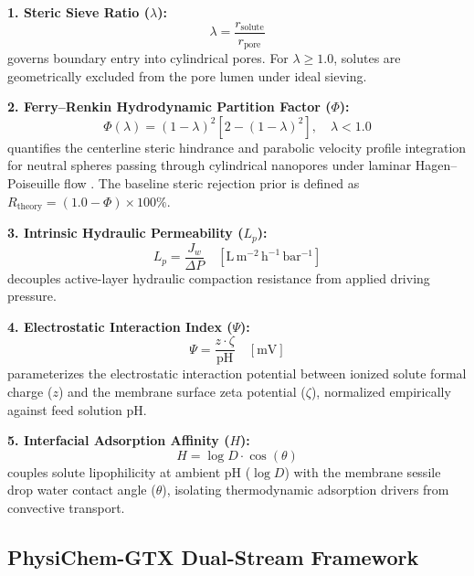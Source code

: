 \documentclass[11pt]{article}
\begin{document}
\textbf{1. Steric Sieve Ratio ($\lambda$):}
\begin{equation}
\lambda = \frac{r_{\mathrm{solute}}}{r_{\mathrm{pore}}}
\label{eq:lambda}
\end{equation}
governs boundary entry into cylindrical pores. For $\lambda \geq 1.0$, solutes are geometrically excluded from the pore lumen under ideal sieving.

\textbf{2. Ferry--Renkin Hydrodynamic Partition Factor ($\Phi$):}
\begin{equation}
\Phi(\lambda) = (1-\lambda)^2 \left[2 - (1-\lambda)^2\right], \quad \lambda < 1.0
\label{eq:ferry_renkin}
\end{equation}
quantifies the centerline steric hindrance and parabolic velocity profile integration for neutral spheres passing through cylindrical nanopores under laminar Hagen--Poiseuille flow \cite{ferry1936,renkin1954}. The baseline steric rejection prior is defined as $R_{\mathrm{theory}} = (1.0 - \Phi) \times 100\%$.

\textbf{3. Intrinsic Hydraulic Permeability ($L_p$):}
\begin{equation}
L_p = \frac{J_w}{\Delta P} \quad \left[\mathrm{L\,m^{-2}\,h^{-1}\,bar^{-1}}\right]
\label{eq:lp}
\end{equation}
decouples active-layer hydraulic compaction resistance from applied driving pressure.

\textbf{4. Electrostatic Interaction Index ($\Psi$):}
\begin{equation}
\Psi = \frac{z \cdot \zeta}{\mathrm{pH}} \quad [\mathrm{mV}]
\label{eq:psi}
\end{equation}
parameterizes the electrostatic interaction potential between ionized solute formal charge ($z$) and the membrane surface zeta potential ($\zeta$), normalized empirically against feed solution pH.

\textbf{5. Interfacial Adsorption Affinity ($H$):}
\begin{equation}
H = \log D \cdot \cos(\theta)
\label{eq:h_affinity}
\end{equation}
couples solute lipophilicity at ambient pH ($\log D$) with the membrane sessile drop water contact angle ($\theta$), isolating thermodynamic adsorption drivers from convective transport.

\subsection{PhysiChem-GTX Dual-Stream Framework}
\label{subsec:architecture}
\end{document}
